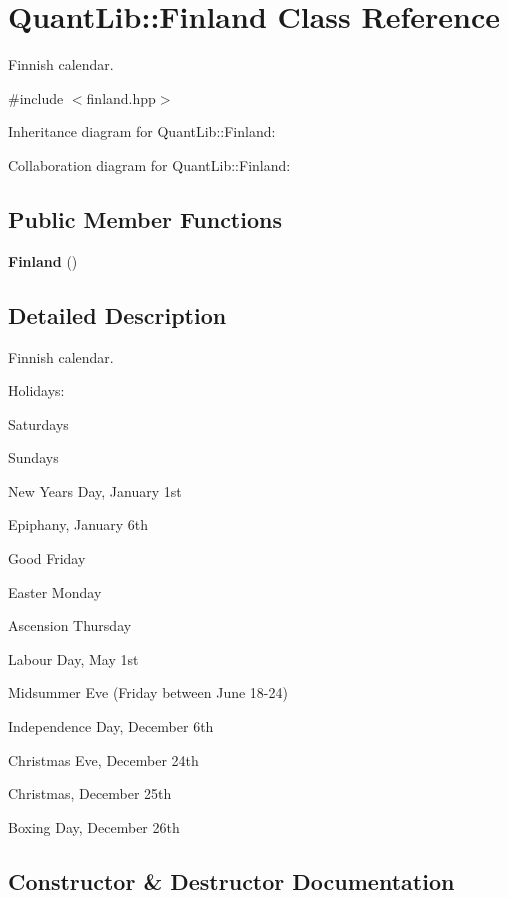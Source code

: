 \section{Quant\+Lib\+:\+:Finland Class Reference}
\label{class_quant_lib_1_1_finland}


Finnish calendar.  




{\ttfamily \#include $<$finland.\+hpp$>$}



Inheritance diagram for Quant\+Lib\+:\+:Finland\+:


Collaboration diagram for Quant\+Lib\+:\+:Finland\+:
\subsection*{Public Member Functions}
\begin{DoxyCompactItemize}
\item 
{\bf Finland} ()
\end{DoxyCompactItemize}


\subsection{Detailed Description}
Finnish calendar. 

Holidays\+: 
\begin{DoxyItemize}
\item Saturdays 
\item Sundays 
\item New Year\textquotesingle{}s Day, January 1st 
\item Epiphany, January 6th 
\item Good Friday 
\item Easter Monday 
\item Ascension Thursday 
\item Labour Day, May 1st 
\item Midsummer Eve (Friday between June 18-\/24) 
\item Independence Day, December 6th 
\item Christmas Eve, December 24th 
\item Christmas, December 25th 
\item Boxing Day, December 26th 
\end{DoxyItemize}

\subsection{Constructor \& Destructor Documentation}
